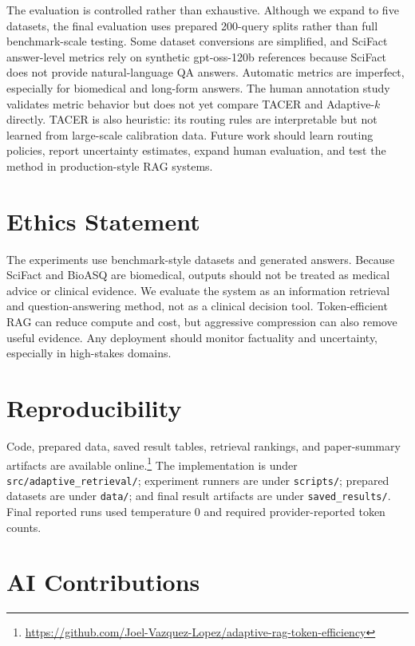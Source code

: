 \documentclass[11pt]{article}
\begin{document}
The evaluation is controlled rather than exhaustive. Although we expand to five datasets, the final evaluation uses prepared 200-query splits rather than full benchmark-scale testing. Some dataset conversions are simplified, and SciFact answer-level metrics rely on synthetic gpt-oss-120b references because SciFact does not provide natural-language QA answers. Automatic metrics are imperfect, especially for biomedical and long-form answers. The human annotation study validates metric behavior but does not yet compare TACER and Adaptive-$k$ directly. TACER is also heuristic: its routing rules are interpretable but not learned from large-scale calibration data. Future work should learn routing policies, report uncertainty estimates, expand human evaluation, and test the method in production-style RAG systems.

\section*{Ethics Statement}

The experiments use benchmark-style datasets and generated answers. Because SciFact and BioASQ are biomedical, outputs should not be treated as medical advice or clinical evidence. We evaluate the system as an information retrieval and question-answering method, not as a clinical decision tool. Token-efficient RAG can reduce compute and cost, but aggressive compression can also remove useful evidence. Any deployment should monitor factuality and uncertainty, especially in high-stakes domains.

\section*{Reproducibility}

Code, prepared data, saved result tables, retrieval rankings, and paper-summary artifacts are available online.\footnote{\url{https://github.com/Joel-Vazquez-Lopez/adaptive-rag-token-efficiency}} The implementation is under \texttt{src/adaptive\_retrieval/}; experiment runners are under \texttt{scripts/}; prepared datasets are under \texttt{data/}; and final result artifacts are under \texttt{saved\_results/}. Final reported runs used temperature 0 and required provider-reported token counts.

\section*{AI Contributions}
\end{document}

